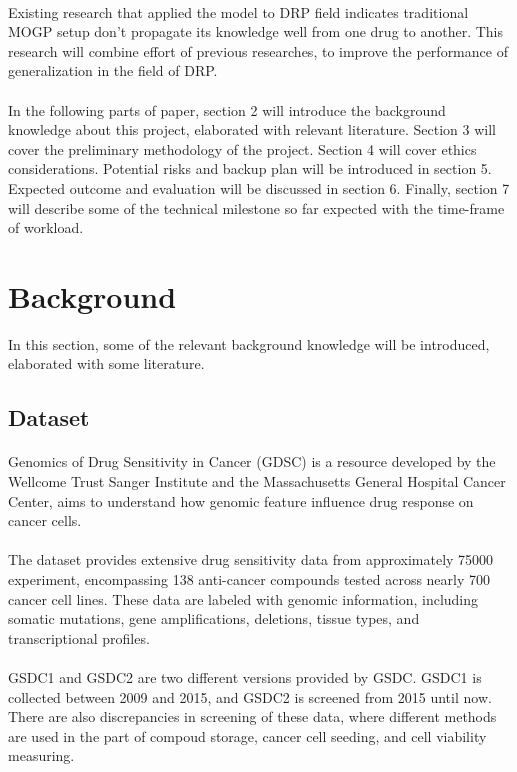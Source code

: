 \documentclass{article}
\begin{document}
\paragraph{}
Existing research that applied the model to DRP field indicates traditional MOGP setup don't propagate its knowledge well from one drug to another.\cite{MOGP} This research will combine effort of previous researches, to improve the performance of generalization in the field of DRP.
\paragraph{}
In the following parts of paper, section 2 will introduce the background knowledge about this project, elaborated with relevant literature. Section 3 will cover the preliminary methodology of the project. Section 4 will cover ethics considerations. Potential risks and backup plan will be introduced in section 5. Expected outcome and evaluation will be discussed in section 6. Finally, section 7 will describe some of the technical milestone so far expected with the time-frame of workload.
\section{Background}
In this section, some of the relevant background knowledge will be introduced, elaborated with some literature. 

\subsection{Dataset}
\paragraph{}
Genomics of Drug Sensitivity in Cancer (GDSC) is a resource developed by the Wellcome Trust Sanger Institute and the Massachusetts General Hospital Cancer Center, aims to understand how genomic feature influence drug response on cancer cells.
\paragraph{}
The dataset provides extensive drug sensitivity data from approximately 75000 experiment, encompassing 138 anti-cancer compounds tested across nearly 700 cancer cell lines. These data are labeled with genomic information, including somatic mutations, gene amplifications, deletions, tissue types, and transcriptional profiles.

\paragraph{}
GSDC1 and GSDC2 are two different versions provided by GSDC. GSDC1 is collected between 2009 and 2015, and GSDC2 is screened from 2015 until now. There are also discrepancies in screening of these data, where different methods are used in the part of compoud storage, cancer cell seeding, and cell viability measuring. 
\end{document}
